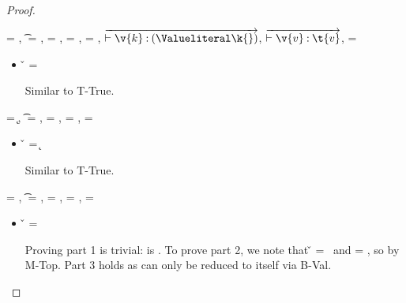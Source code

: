 \begin{lemma}
\begin{proof}
\begin{case}[T-True]
\begin{itemize}
\end{itemize}

\begin{case}[T-HMap] \e{} = {},
  \t{} = {\HMapc {\mandatory{}}},
  \thenprop{\prop{}} = {\topprop{}},
  \elseprop{\prop{}} = {\botprop{}},
  \object{} = {\emptyobject{}},
  $\overrightarrow{\judgementtwo {} {\hastype{\v{k}}{\Value \k{}}}}$,
  $\overrightarrow{\judgementtwo {} {\hastype{\v{v}}{\t{v}}}}$,
  \mandatory{} = 

  \begin{itemize}
    \item[]
      \begin{subcase}[B-Val] \v{} = {}

        Similar to T-True.
      \end{subcase}
  \end{itemize}
\end{case}

\begin{case}[T-Kw] \e{} = {\k{}},
  \t{} = {\Value{\k{}}},
  \thenprop{\prop{}} = {\topprop{}},
  \elseprop{\prop{}} = {\botprop{}},
  \object{} = {\emptyobject{}}

  \begin{itemize}
    \item[]
      \begin{subcase}[B-Val] \v{} = {\k{}}

        Similar to T-True.
      \end{subcase}
  \end{itemize}
\end{case}

\end{case}

\begin{case}[T-False]
\e{} = \false, \t{} = \False, \thenprop{\prop{}} = \botprop{}, \elseprop{\prop{}} = \topprop{}, \object{} = \emptyobject{}

\begin{itemize}
  \item[] 
    \begin{subcase}[B-Val]
      \v{} = \false{}

Proving part 1 is trivial: \object{} is \emptyobject. To prove part 2, we note that \v{} = \false\ 
and \elseprop{\prop{}} = \topprop{}, so \satisfies{\openv{}}{\elseprop{\prop{}}} by M-Top. 
Part 3 holds as \e{} can only be reduced to itself via B-Val.
\end{subcase}


\end{itemize}
\end{case}
\end{proof}
\end{lemma}
